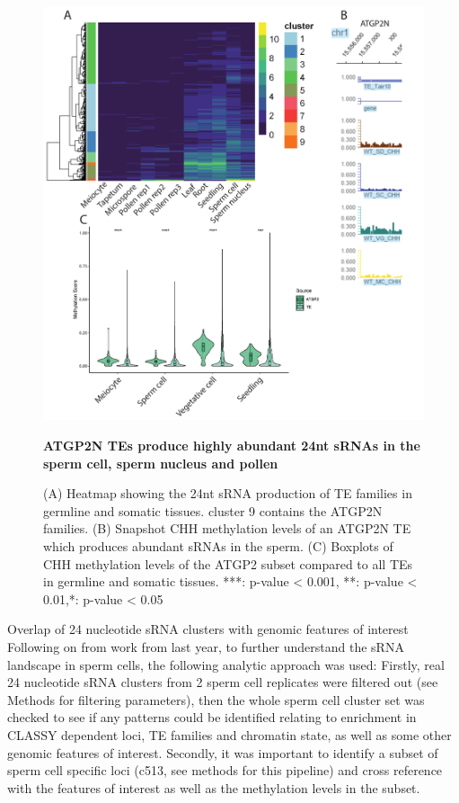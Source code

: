\begin{figure}[htbp!] 
\centering    
    \includegraphics[width=1\textwidth]{Chapter2/Figs/Figure13_TE_families_heatmap.pdf}
\caption{\textbf{ATGP2N TEs produce highly abundant 24nt sRNAs in the sperm cell, sperm nucleus and pollen}}
\label{fig:TE_families}
\captionsetup{font=small}
    \caption*{(A) Heatmap showing the 24nt sRNA production of TE families in germline and somatic tissues. cluster 9 contains the ATGP2N families. (B) Snapshot CHH methylation levels of an ATGP2N TE which produces abundant sRNAs in the sperm. (C) Boxplots of CHH methylation levels of the ATGP2 subset compared to all TEs in germline and somatic tissues. ***: p-value < 0.001, **: p-value < 0.01,*: p-value < 0.05}
\end{figure}


Overlap of 24 nucleotide sRNA clusters with genomic features of interest
Following on from work from last year, to further understand the sRNA landscape in sperm cells, the following analytic approach was used: Firstly, real 24 nucleotide sRNA clusters from 2 sperm cell replicates were filtered out (see Methods for filtering parameters), then the whole sperm cell cluster set was checked to see if any patterns could be identified relating to enrichment in CLASSY dependent loci, TE families and chromatin state, as well as some other genomic features of interest. Secondly, it was important to identify a subset of sperm cell specific loci (c513, see methods for this pipeline) and cross reference with the features of interest as well as the methylation levels in the subset.

